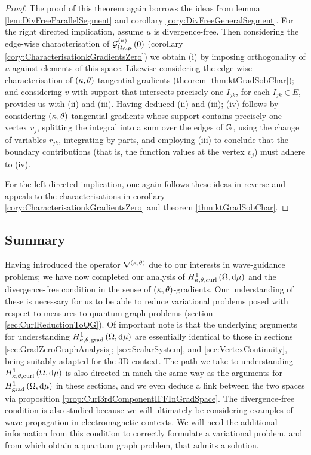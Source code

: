 \begin{proof}
	The proof of this theorem again borrows the ideas from lemma \ref{lem:DivFreeParallelSegment} and corollary \ref{cory:DivFreeGeneralSegment}.
	For the right directed implication, assume $u$ is divergence-free.
	Then considering the edge-wise characterisation of $\mathcal{G}_{ \Omega, \mathrm{d}\mu}^{(\kappa)}\left( 0 \right)$ (corollary \ref{cory:CharacterisationkGradientsZero}) we obtain (i) by imposing orthogonality of $u$ against elements of this space.
	Likewise considering the edge-wise characterisation of $\left( \kappa, \theta \right)$-tangential gradients (theorem \ref{thm:ktGradSobChar}); and considering $v$ with support that intersects precisely one $I_{jk}$, for each $I_{jk}\in E$, provides us with (ii) and (iii).
	Having deduced (ii) and (iii); (iv) follows by considering $\left( \kappa, \theta \right)$-tangential-gradients whose support contains precisely one vertex $v_j$, splitting the integral into a sum over the edges of $\mathbb{G}$, using the change of variables $r_{jk}$, integrating by parts, and employing (iii) to conclude that the boundary contributions (that is, the function values at the vertex $v_j$) must adhere to (iv). \newline
	
	For the left directed implication, one again follows these ideas in reverse and appeals to the characterisations in corollary \ref{cory:CharacterisationkGradientsZero} and theorem \ref{thm:ktGradSobChar}.
\end{proof}

\subsection{Summary}
Having introduced the operator $\nabla^{\left( \kappa, \theta \right)}$ due to our interests in wave-guidance problems; we have now completed our analysis of $H^1_{\kappa,\theta,\mathrm{curl}}\left( \Omega, \mathrm{d}\mu \right)$ and the divergence-free condition in the sense of $\left( \kappa, \theta \right)$-gradients.
Our understanding of these is necessary for us to be able to reduce variational problems posed with respect to measures to quantum graph problems (section \ref{sec:CurlReductionToQG}).
Of important note is that the underlying arguments for understanding $H^1_{\kappa,\theta,\mathrm{grad}}\left( \Omega, \mathrm{d}\mu \right)$ are essentially identical to those in sections \ref{sec:GradZeroGraphAnalysis}; \ref{sec:ScalarSystem}, and \ref{sec:VertexContinuity}, being suitably adapted for the 3D context.
The path we take to understanding $H^1_{\kappa,\theta,\mathrm{curl}}\left( \Omega, \mathrm{d}\mu \right)$ is also directed in much the same way as the arguments for $H^1_\mathrm{grad}\left( \Omega, \mathrm{d}\mu \right)$ in these sections, and we even deduce a link between the two spaces via proposition \ref{prop:Curl3rdComponentIFFInGradSpace}.
The divergence-free condition is also studied because we will ultimately be considering examples of wave propagation in electromagnetic contexts.
We will need the additional information from this condition to correctly formulate a variational problem, and from which obtain a quantum graph problem, that admits a solution.

